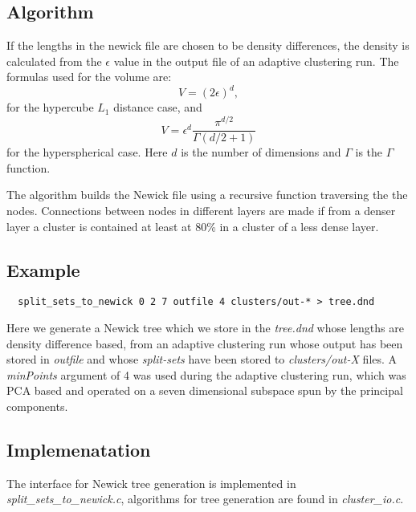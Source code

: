 \subsection{Algorithm}
If the lengths in the newick file are chosen to be density
differences, the density is calculated from the $\epsilon$ value in
the output file of an adaptive clustering run.
The formulas used for the volume are:
\begin{equation}
  V = (2\epsilon)^d,
\end{equation}
for the hypercube $L_1$ distance case, and
\begin{equation}
  V = \epsilon^{d}\frac{\pi^{d/2}}{\Gamma(d/2+1)}
\end{equation}
for the hyperspherical case. Here $d$ is the number of dimensions
and $\Gamma$ is the $\Gamma$ function.

The algorithm builds the Newick file using a recursive function traversing
the the nodes. Connections between nodes in different layers are made
if from a denser layer a cluster is contained at least at 80\% in a
cluster of a less dense layer. 

\subsection{Example}

\begin{lstlisting}
  split_sets_to_newick 0 2 7 outfile 4 clusters/out-* > tree.dnd
\end{lstlisting}
Here we generate a Newick tree which we store in the \emph{tree.dnd}
whose lengths are density difference based, from an adaptive
clustering run whose output has been stored in \emph{outfile} and
whose \emph{split-sets} have been stored to \emph{clusters/out-X}
files. A \emph{minPoints} argument of 4 was used during the adaptive
clustering run, which was PCA based and operated on a seven
dimensional subspace spun by the principal components. 

\subsection{Implemenatation}
The interface for Newick tree generation is implemented in
\emph{split\_sets\_to\_newick.c}, algorithms for tree generation are
found in \emph{cluster\_io.c}.
